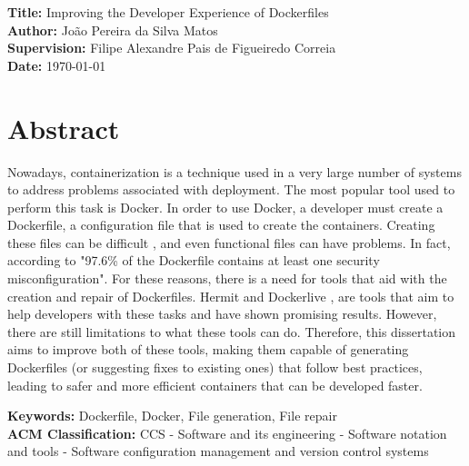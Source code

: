 \documentclass[11pt,a4paper]{article}
\newcommand{\titles}[2]{\noindent\textbf{#1:} #2\\[2mm]}
\begin{document}
\titles{Title}{Improving the Developer Experience of Dockerfiles}
\titles{Author}{João Pereira da Silva Matos}
\titles{Supervision}{Filipe Alexandre Pais de Figueiredo Correia}
\titles{Date}{\today}

\section*{Abstract}

Nowadays, containerization is a technique used in a very large number of systems to address problems associated with deployment. The most popular tool used to perform this task is Docker. In order to use Docker, a developer must create a Dockerfile, a configuration file that is used to create the containers. Creating these files can be difficult \cite{reisLiveDockerContainers2020}, and even functional files can have problems. In fact, according to \cite{prinettoSecurityMisconfigurationsDetection} "97.6\% of the Dockerfile contains at least one security misconfiguration". For these reasons, there is a need for tools that aid with the creation and repair of Dockerfiles. Hermit \cite{maduroAutomaticServiceContainerization2021} and Dockerlive \cite{reisLiveDockerContainers2020}, are tools that aim to help developers with these tasks and have shown promising results. However, there are still limitations to what these tools can do. Therefore, this dissertation aims to improve both of these tools, making them capable of generating Dockerfiles (or suggesting fixes to existing ones) that follow best practices, leading to safer and more efficient containers that can be developed faster.


\titles{Keywords}{Dockerfile, Docker, File generation, File repair}
\titles{ACM Classification}{CCS - Software and its engineering - Software notation and tools - Software configuration management and version control systems
}



\nocite{*}  %



\end{document}
